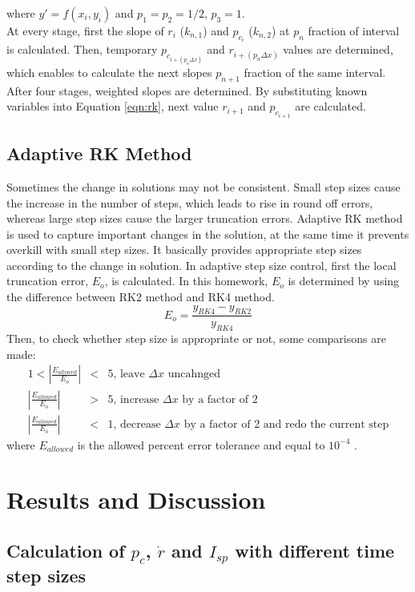 \documentclass[letterpaper,12pt]{article}
\begin{document}
where $y\prime = f(x_i,y_i)$ and $p_1=p_2=1/2$, $p_3=1$.\\
At every stage, first the slope of $r_i$ ($k_{n,1}$) and  $p_{c_{i}}$ ($k_{n,2}$) at $p_n$ fraction of interval is calculated. 
Then, temporary $p_{c_{i+(p_n\Delta x)}}$ and $r_{i+(p_n\Delta x)}$ values are determined, which enables to calculate the next 
slopes $p_{n+1}$ fraction of the same interval. After four stages, weighted slopes are determined. By substituting known 
variables into Equation \ref{eqn:rk}, next value $r_{i+1}$ and $p_{c_{i+1}}$ are calculated. 
\subsection{Adaptive RK Method}
Sometimes the change in solutions may not be consistent. Small step sizes cause the increase in the number of steps, which leads to
rise in round off errors, whereas large step sizes cause the larger truncation errors. Adaptive RK method is used to capture important
changes in the solution, at the same time it prevents overkill with small step sizes. It basically provides appropriate step sizes 
according to the change in solution. In adaptive step size control, first the local truncation error, $E_o$, is calculated. In this 
homework, $E_o$ is determined by using the difference between RK2 method and RK4 method.
\begin{equation}
	E_o = \frac{y_{RK4}-y_{RK2}}{y_{RK4}}
\end{equation}
Then, to check whether step size is appropriate or not, some comparisons are made:
\begin{eqnarray}
	1 < \left\lvert \frac{E_{allowed}}{E_o} \right\rvert &<& 5 \textrm{, leave $\Delta x$ uncahnged} \nonumber \\
	\left\lvert \frac{E_{allowed}}{E_o} \right\rvert &>& 5  \textrm{, increase $\Delta x$ by a factor of 2} \nonumber \\
	\left\lvert \frac{E_{allowed}}{E_o} \right\rvert &<& 1  \textrm{, decrease $\Delta x$ by a factor of 2 and redo the current step} \nonumber 
\end{eqnarray}
where $E_{allowed}$ is the allowed percent error tolerance and equal to $10^{-4}$  .


\newpage

\section{Results and Discussion}
\subsection{Calculation of $p_c$, $\dot{r}$ and $I_{sp}$ with different time step sizes}
\end{document}

